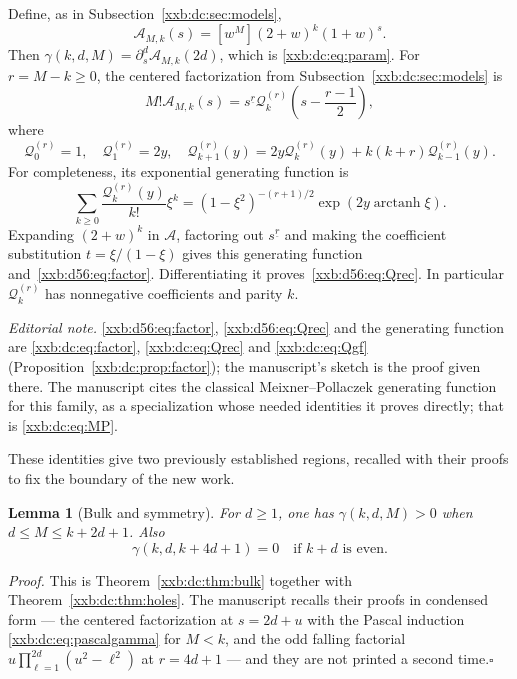 \documentclass[11pt,a4paper]{article}
\numberwithin{equation}{section}
\newtheorem{lemma}[theorem]{Lemma}
\theoremstyle{definition}
\theoremstyle{remark}
\theoremstyle{plain}
\newcommand{\fall}[2]{#1^{\underline{#2}}}
\begin{document}
Define, as in Subsection~\ref{xxb:dc:sec:models},
\[
 \mathcal A_{M,k}(s)=[w^M](2+w)^k(1+w)^s.
\]
Then $\gamma(k,d,M)=\partial_s^d\mathcal A_{M,k}(2d)$, which is
\eqref{xxb:dc:eq:param}. For $r=M-k\ge0$, the centered factorization from
Subsection~\ref{xxb:dc:sec:models} is
\begin{equation}\label{xxb:d56:eq:factor}
 M!\mathcal A_{M,k}(s)=\fall{s}{r}\mathcal Q_k^{(r)}\left(s-\frac{r-1}{2}\right),
\end{equation}
where
\begin{equation}\label{xxb:d56:eq:Qrec}
 \mathcal Q_0^{(r)}=1,\quad \mathcal Q_1^{(r)}=2y,\quad
 \mathcal Q_{k+1}^{(r)}(y)=2y\mathcal Q_k^{(r)}(y)+k(k+r)\mathcal Q_{k-1}^{(r)}(y).
\end{equation}
For completeness, its exponential generating function is
\[
 \sum_{k\ge0}\frac{\mathcal Q_k^{(r)}(y)}{k!}\xi^k
 =(1-\xi^2)^{-(r+1)/2}\exp(2y\operatorname{arctanh}\xi).
\]
Expanding $(2+w)^k$ in $\mathcal A$, factoring out $\fall{s}{r}$ and making the
coefficient substitution $t=\xi/(1-\xi)$ gives this generating function
and~\eqref{xxb:d56:eq:factor}. Differentiating it proves~\eqref{xxb:d56:eq:Qrec}.
In particular $\mathcal Q_k^{(r)}$ has nonnegative coefficients and parity $k$.

\emph{Editorial note.}  \eqref{xxb:d56:eq:factor}, \eqref{xxb:d56:eq:Qrec}
and the generating function are \eqref{xxb:dc:eq:factor},
\eqref{xxb:dc:eq:Qrec} and \eqref{xxb:dc:eq:Qgf}
(Proposition~\ref{xxb:dc:prop:factor}); the manuscript's sketch is the proof
given there.  The manuscript cites the classical Meixner--Pollaczek generating
function \cite[Eq.~18.23.7]{xxbdc-dlmf} for this family, as a specialization
whose needed identities it proves directly; that is \eqref{xxb:dc:eq:MP}.

These identities give two previously established regions, recalled with their
proofs to fix the boundary of the new work.
\begin{lemma}[Bulk and symmetry]\label{xxb:d56:lem:bulk}
For $d\ge1$, one has $\gamma(k,d,M)>0$ when $d\le M\le k+2d+1$. Also
\[
 \gamma(k,d,k+4d+1)=0\quad\text{if }k+d\text{ is even}.
\]
\end{lemma}
\emph{Proof.}  This is Theorem~\ref{xxb:dc:thm:bulk} together with
Theorem~\ref{xxb:dc:thm:holes}.  The manuscript recalls their proofs in
condensed form --- the centered factorization at $s=2d+u$ with the Pascal
induction \eqref{xxb:dc:eq:pascalgamma} for $M<k$, and the odd falling
factorial $u\prod_{\ell=1}^{2d}(u^2-\ell^2)$ at $r=4d+1$ --- and they are not
printed a second time.\hfill$\square$
\end{document}

